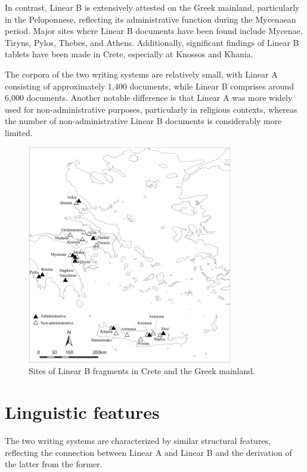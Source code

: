 In contrast, Linear B is extensively attested on the Greek mainland, particularly in the Peloponnese, reflecting its administrative function during the Mycenaean period.
Major sites where Linear B documents have been found include Mycenae, Tiryns, Pylos, Thebes, and Athens.
Additionally, significant findings of Linear B tablets have been made in Crete, especially at Knossos and Khania.

The corpora of the two writing systems are relatively small, with Linear A consisting of approximately 1,400 documents, while Linear B comprises around 6,000 documents.
Another notable difference is that Linear A was more widely used for non-administrative purposes, particularly in religious contexts, whereas the number of non-administrative Linear B documents is considerably more limited. \cite{salg-ch1}


\begin{figure}[H]
    \centering
    \includegraphics[width=0.8\textwidth]{Images/mainland_LB.jpg} %
    \caption{Sites of Linear B fragments in Crete and the Greek mainland. \protect\footnotemark}
    \label{fig:mainland_LB}
\end{figure}


\section{Linguistic features}
The two writing systems are characterized by similar structural features, reflecting the connection between Linear A and Linear B and the derivation of the latter from the former.

